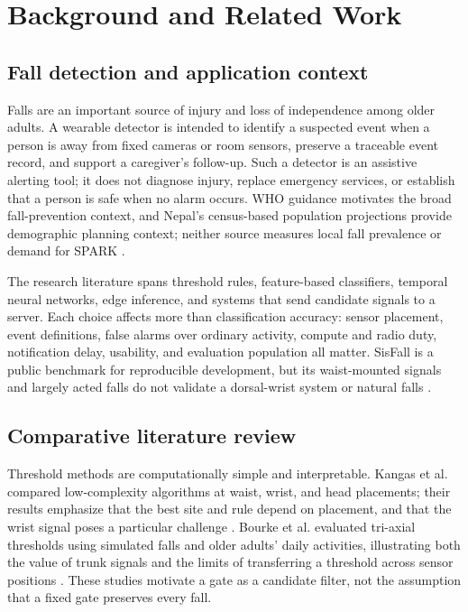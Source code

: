 \chapter{Background and Related Work}
\label{ch:background}

\section{Fall detection and application context}
Falls are an important source of injury and loss of independence among older adults. A wearable detector is intended to identify a suspected event when a person is away from fixed cameras or room sensors, preserve a traceable event record, and support a caregiver's follow-up. Such a detector is an assistive alerting tool; it does not diagnose injury, replace emergency services, or establish that a person is safe when no alarm occurs. WHO guidance motivates the broad fall-prevention context, and Nepal's census-based population projections provide demographic planning context; neither source measures local fall prevalence or demand for SPARK \cite{who2007falls,cbs2021nepal}.

The research literature spans threshold rules, feature-based classifiers, temporal neural networks, edge inference, and systems that send candidate signals to a server. Each choice affects more than classification accuracy: sensor placement, event definitions, false alarms over ordinary activity, compute and radio duty, notification delay, usability, and evaluation population all matter. SisFall is a public benchmark for reproducible development, but its waist-mounted signals and largely acted falls do not validate a dorsal-wrist system or natural falls \cite{sucerquia2017sisfall}.

\section{Comparative literature review}
Threshold methods are computationally simple and interpretable. Kangas et al. compared low-complexity algorithms at waist, wrist, and head placements; their results emphasize that the best site and rule depend on placement, and that the wrist signal poses a particular challenge \cite{kangas2008comparison}. Bourke et al. evaluated tri-axial thresholds using simulated falls and older adults' daily activities, illustrating both the value of trunk signals and the limits of transferring a threshold across sensor positions \cite{bourke2008threshold}. These studies motivate a gate as a candidate filter, not the assumption that a fixed gate preserves every fall.

